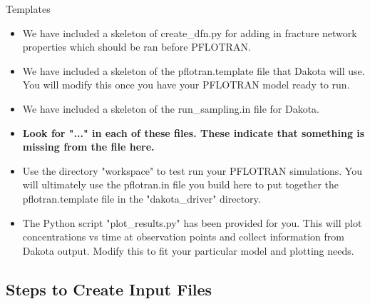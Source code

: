 \documentclass{beamer}
\begin{document}
\begin{frame}[fragile]{Templates}	
       \begin{itemize}
    		\item We have included a skeleton of create\_dfn.py for adding in fracture network properties which should be ran before PFLOTRAN.
		\item We have included a skeleton of the pflotran.template file that Dakota will use. You will modify this once you have your PFLOTRAN model ready to run.
		\item We have included a skeleton of the run\_sampling.in file for Dakota. 
		\item \textbf{Look for "..." in each of these files. These indicate that something is missing from the file here.}
		\item Use the directory "workspace" to test run your PFLOTRAN simulations. You will ultimately use the pflotran.in file you build here to put together the pflotran.template file in the "dakota\_driver" directory.
		\item The Python script "plot\_results.py" has been provided for you. This will plot concentrations vs time at observation points and collect information from Dakota output. Modify this to fit your particular model and plotting needs.
	\end{itemize}
	
\end{frame}

\subsection{Steps to Create Input Files}
\end{document}
